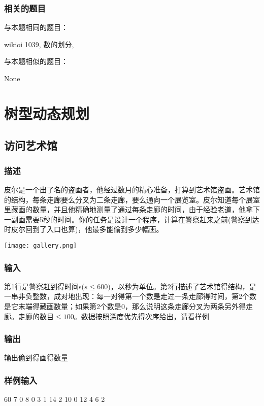 \subsubsection{相关的题目}
与本题相同的题目：
\begindot
\item wikioi 1039, 数的划分, 
\myenddot

与本题相似的题目：
\begindot
\item  None
\myenddot


\section{树型动态规划} %

\subsection{访问艺术馆}

\subsubsection{描述}
皮尔是一个出了名的盗画者，他经过数月的精心准备，打算到艺术馆盗画。艺术馆的结构，每条走廊要么分叉为二条走廊，要么通向一个展览室。皮尔知道每个展室里藏画的数量，并且他精确地测量了通过每条走廊的时间，由于经验老道，他拿下一副画需要5秒的时间。你的任务是设计一个程序，计算在警察赶来之前(警察到达时皮尔回到了入口也算)，他最多能偷到多少幅画。

\begin{center}
\texttt{[image: gallery.png]}\\
\label{fig:gallery}
\end{center}

\subsubsection{输入}
第1行是警察赶到得时间s($s \leq 600$)，以秒为单位。第2行描述了艺术馆得结构，是一串非负整数，成对地出现：每一对得第一个数是走过一条走廊得时间，第2个数是它末端得藏画数量；如果第2个数是0，那么说明这条走廊分叉为两条另外得走廊。走廊的数目$ \leq 100$。数据按照深度优先得次序给出，请看样例

\subsubsection{输出}
输出偷到得画得数量

\subsubsection{样例输入}
\begin{Code}
60
7 0 8 0 3 1 14 2 10 0 12 4 6 2
\end{Code}

